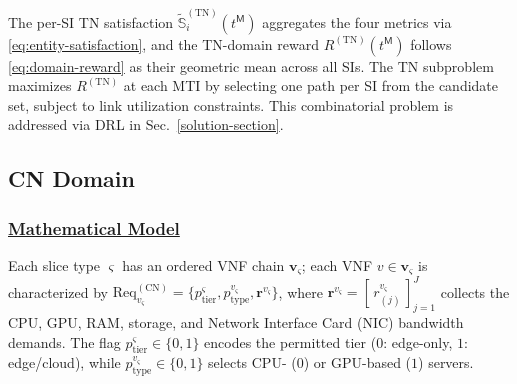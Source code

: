 \documentclass[12pt,lettersize,journal,onecolumn]{IEEEtran}
\newcounter{constraintT}
\renewcommand{\theconstraintT}{C\arabic{constraintT}-T}
\newenvironment{NamedConstraintT}{%
  \refstepcounter{constraintT}%
  \par\noindent
  \textbf{\theconstraintT:}\,    %
  \begin{math}
}{%
  \end{math}
  \par\vspace{2pt}%
}
\begin{document}
The per-SI TN satisfaction $\tilde{\mathbb{S}}^{\mathrm{(TN)}}_{i}(t^\mathsf{M})$ aggregates the four metrics via \eqref{eq:entity-satisfaction}, and the TN-domain reward $R^{\mathrm{(TN)}}(t^\mathsf{M})$ follows \eqref{eq:domain-reward} as their geometric mean across all SIs. The TN subproblem maximizes $R^{\mathrm{(TN)}}$ at each MTI by selecting one path per SI from the candidate set, subject to link utilization constraints. This combinatorial problem is addressed via DRL in Sec.~\ref{solution-section}.

\subsection{CN Domain} \label{cn-domain-section}

\subsubsection{\underline{Mathematical Model}} \label{cn-model-subsection}
Each slice type $\varsigma$ has an ordered VNF chain $\boldsymbol{v}_{\varsigma}$; each VNF $v\in\boldsymbol{v}_{\varsigma}$ is characterized by
$\mathrm{Req}^{\mathrm{(CN)}}_{v_{\varsigma}}=\{p^{\varsigma}_{\mathrm{tier}},p^{v_{\varsigma}}_{\mathrm{type}},\boldsymbol{r}^{v_{\varsigma}}\}$,
where $\boldsymbol{r}^{v_{\varsigma}}=[\,r^{v_{\varsigma}}_{(j)}\,]_{j=1}^{J}$ collects the CPU, GPU, RAM, storage, and Network Interface Card (NIC) bandwidth demands. The flag $p^{\varsigma}_{\mathrm{tier}}\in\{0,1\}$ encodes the permitted tier ($0$: edge-only, $1$: edge/cloud), while $p^{v_{\varsigma}}_{\mathrm{type}}\in\{0,1\}$ selects CPU- ($0$) or GPU-based ($1$) servers. %
\end{document}
